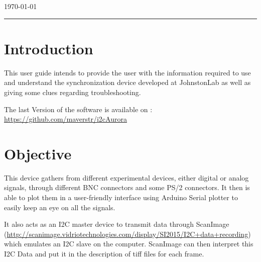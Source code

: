 \documentclass[a4paper]{article}
\begin{document}
\begin{titlepage}


{\large \today}\\[2cm] %


\vfill %

\end{titlepage}


\noindent\rule{\textwidth}{1pt}

\tableofcontents

\newpage

\listoffigures

\newpage



\section{Introduction}
This user guide intends to provide the user with the information required to use and understand the synchronization device developed at JohnstonLab as well as giving some clues regarding troubleshooting.

The last Version of the software is available on : \url{https://github.com/maverstr/i2cAurora}

\section{Objective}
This device gathers from different experimental devices, either digital or analog signals, through different BNC connectors and some PS/2 connectors. 
It then is able to plot them in a user-friendly interface using Arduino Serial plotter to easily keep an eye on all the signals.

It also acts as an I2C master device to transmit data through ScanImage (\url{http://scanimage.vidriotechnologies.com/display/SI2015/I2C+data+recording}) which emulates an I2C slave on the computer.
ScanImage can then interpret this I2C Data and put it in the description of tiff files for each frame.
\end{document}
